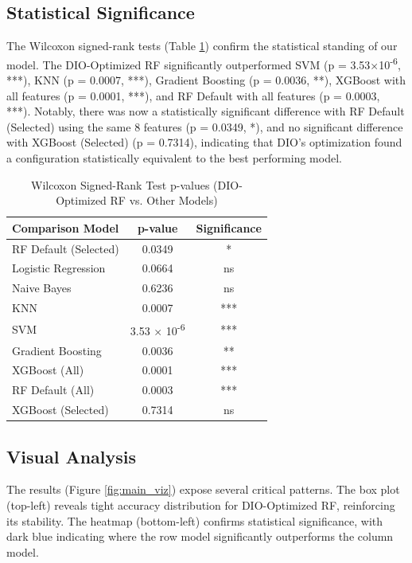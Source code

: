 \documentclass[12pt, a4paper]{article}
\begin{document}
\subsection{Statistical Significance}
The Wilcoxon signed-rank tests (Table \ref{tab:wilcoxon}) confirm the statistical standing of our model. The DIO-Optimized RF significantly outperformed SVM (p = 3.53×10\textsuperscript{-6}, ***), KNN (p = 0.0007, ***), Gradient Boosting (p = 0.0036, **), XGBoost with all features (p = 0.0001, ***), and RF Default with all features (p = 0.0003, ***). Notably, there was now a statistically significant difference with RF Default (Selected) using the same 8 features (p = 0.0349, *), and no significant difference with XGBoost (Selected) (p = 0.7314), indicating that DIO's optimization found a configuration statistically equivalent to the best performing model.

\begin{table}[H]
    \centering
    \caption{Wilcoxon Signed-Rank Test p-values (DIO-Optimized RF vs. Other Models)}
    \label{tab:wilcoxon}
    \begin{tabular}{lcc}
        \toprule
        \textbf{Comparison Model} & \textbf{p-value} & \textbf{Significance} \\
        \midrule
        RF Default (Selected) & 0.0349 & * \\
        Logistic Regression & 0.0664 & ns \\
        Naive Bayes & 0.6236 & ns \\
        KNN & 0.0007 & *** \\
        SVM & 3.53 × 10\textsuperscript{-6} & *** \\
        Gradient Boosting & 0.0036 & ** \\
        XGBoost (All) & 0.0001 & *** \\
        RF Default (All) & 0.0003 & *** \\
        XGBoost (Selected) & 0.7314 & ns \\
        \bottomrule
    \end{tabular}
\end{table}

\subsection{Visual Analysis}
The results (Figure \ref{fig:main_viz}) expose several critical patterns. The box plot (top-left) reveals tight accuracy distribution for DIO-Optimized RF, reinforcing its stability. The heatmap (bottom-left) confirms statistical significance, with dark blue indicating where the row model significantly outperforms the column model.
\end{document}
